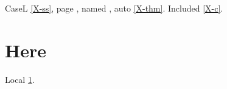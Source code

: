 \documentclass{article}
\begin{document}
CaseL \ref{X-ss}, page \pageref{X-front}, named , auto \autoref{X-thm}.
Included \ref{X-c}.

\section{Here}\label{here}
Local \ref{here}.
\end{document}
